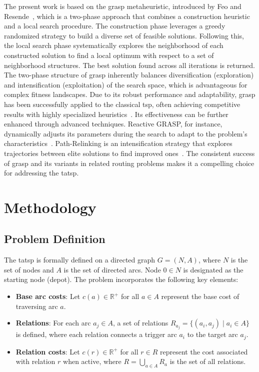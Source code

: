 \documentclass[twocolumn, switch]{article} %
\begin{document}
The present work is based on the \gls{grasp} metaheuristic, introduced by Feo and Resende~\cite{Feo1995}, which is a two-phase approach that combines a construction heuristic and a local search procedure.
The construction phase leverages a greedy randomized strategy to build a diverse set of feasible solutions. Following this, the local search phase systematically explores the neighborhood of each constructed solution to find a local optimum with respect to a set of neighborhood structures.
The best solution found across all iterations is returned. The two-phase structure of \gls{grasp} inherently balances diversification (exploration) and intensification (exploitation) of the search space, which is advantageous for complex fitness landscapes.
Due to its robust performance and adaptability, \gls{grasp} has been successfully applied to the classical \gls{tsp}, often achieving competitive results with highly specialized heuristics~\cite{Oliveira2004}. 
Its effectiveness can be further enhanced through advanced techniques. Reactive GRASP, for instance, dynamically adjusts its parameters during the search to adapt to the problem's characteristics~\cite{Prais2000}. 
Path-Relinking is an intensification strategy that explores trajectories between elite solutions to find improved ones~\cite{Resende2019}. The consistent success of \gls{grasp} and its variants in related routing problems makes it a compelling choice for addressing the \gls{tatsp}.

\section{Methodology}

\subsection{Problem Definition}

The \gls{tatsp} is formally defined on a directed graph $G = (N, A)$, where $N$ is the set of nodes and $A$ is the set of directed arcs. Node $0 \in N$ is designated as the starting node (depot). The problem incorporates the following key elements:

\begin{itemize}
\item \textbf{Base arc costs}: Let $c(a) \in \mathbb{R}^+$ for all $a \in A$ represent the base cost of traversing arc $a$.
\item \textbf{Relations}: For each arc $a_j \in A$, a set of relations $R_{a_j} = \{(a_i, a_j) \mid a_i \in A\}$ is defined, where each relation connects a trigger arc $a_i$ to the target arc $a_j$.
\item \textbf{Relation costs}: Let $c(r) \in \mathbb{R}^+$ for all $r \in R$ represent the cost associated with relation $r$ when active, where $R = \bigcup_{a \in A} R_a$ is the set of all relations.
\end{itemize}
\end{document}
